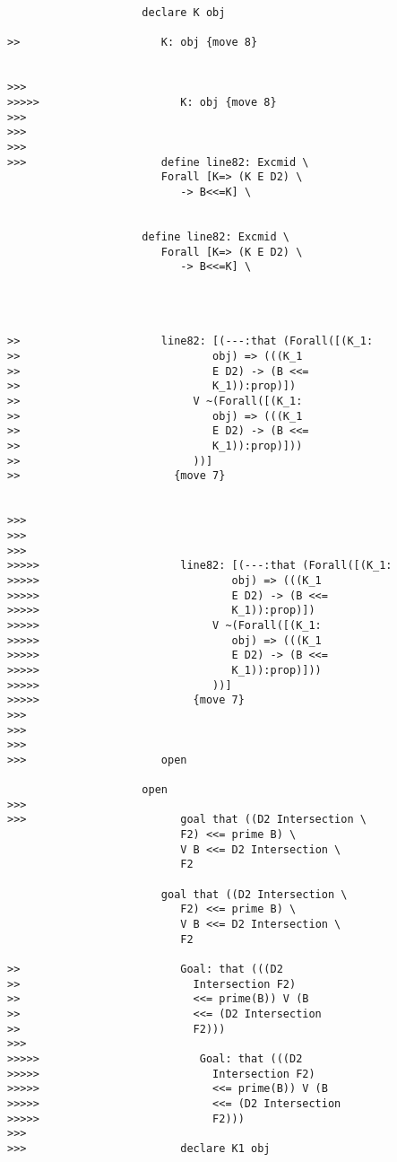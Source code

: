 \documentclass[12pt]{article}
\begin{document}
\begin{verbatim}
                     declare K obj

>>                      K: obj {move 8}


>>>
>>>>>                      K: obj {move 8}
>>>
>>>
>>>
>>>                     define line82: Excmid \
                        Forall [K=> (K E D2) \
                           -> B<<=K] \
                        

                     define line82: Excmid \
                        Forall [K=> (K E D2) \
                           -> B<<=K] \
                        



>>                      line82: [(---:that (Forall([(K_1:
>>                              obj) => (((K_1
>>                              E D2) -> (B <<=
>>                              K_1)):prop)])
>>                           V ~(Forall([(K_1:
>>                              obj) => (((K_1
>>                              E D2) -> (B <<=
>>                              K_1)):prop)]))
>>                           ))]
>>                        {move 7}


>>>
>>>
>>>
>>>>>                      line82: [(---:that (Forall([(K_1:
>>>>>                              obj) => (((K_1
>>>>>                              E D2) -> (B <<=
>>>>>                              K_1)):prop)])
>>>>>                           V ~(Forall([(K_1:
>>>>>                              obj) => (((K_1
>>>>>                              E D2) -> (B <<=
>>>>>                              K_1)):prop)]))
>>>>>                           ))]
>>>>>                        {move 7}
>>>
>>>
>>>
>>>                     open

                     open
>>>
>>>                        goal that ((D2 Intersection \
                           F2) <<= prime B) \
                           V B <<= D2 Intersection \
                           F2

                        goal that ((D2 Intersection \
                           F2) <<= prime B) \
                           V B <<= D2 Intersection \
                           F2

>>                         Goal: that (((D2
>>                           Intersection F2)
>>                           <<= prime(B)) V (B
>>                           <<= (D2 Intersection
>>                           F2)))
>>>
>>>>>                         Goal: that (((D2
>>>>>                           Intersection F2)
>>>>>                           <<= prime(B)) V (B
>>>>>                           <<= (D2 Intersection
>>>>>                           F2)))
>>>
>>>                        declare K1 obj


\end{verbatim}
\end{document}
